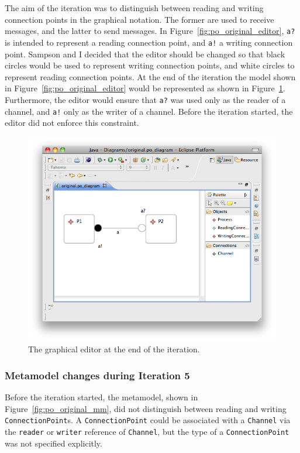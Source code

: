 The aim of the iteration was to distinguish between reading and writing connection points in the graphical notation. The former are used to receive messages, and the latter to send messages. In Figure~\ref{fig:po_original_editor}, \texttt{a?} is intended to represent a reading connection point, and \texttt{a!} a writing connection point. Sampson and I decided that the editor should be changed so that black circles would be used to represent writing connection points, and white circles to represent reading connection points. At the end of the iteration the model shown in Figure~\ref{fig:po_original_editor} would be represented as shown in Figure~\ref{fig:po_evolved_editor}. Furthermore, the editor would ensure that \texttt{a?} was used only as the reader of a channel, and \texttt{a!} only as the writer of a channel. Before the iteration started, the editor did not enforce this constraint.

\begin{figure}[htbp]
	\centering
	\includegraphics[width=12.75cm]{6.Evaluation/images/user_driven/po_evolved_editor.png}
	\caption{The graphical editor at the end of the iteration.}
	\label{fig:po_evolved_editor}
\end{figure}


\subsubsection{Metamodel changes during Iteration 5}
Before the iteration started, the metamodel, shown in Figure~\ref{fig:po_original_mm}, did not distinguish between reading and writing \texttt{Co\-nn\-ec\-ti\-o\-nPo\-i\-nt}s. A \texttt{Co\-nn\-ec\-ti\-o\-nPo\-i\-nt} could be associated with a \texttt{Ch\-an\-nel} via the \texttt{re\-ad\-er} or \texttt{wr\-it\-er} reference of \texttt{Ch\-an\-nel}, but the type of a \texttt{Co\-nn\-ec\-ti\-o\-nPo\-i\-nt} was not specified explicitly.


